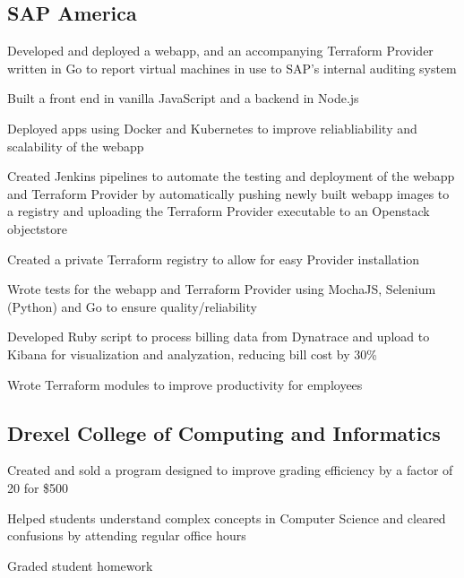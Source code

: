 \documentclass[]{deedy-resume-openfont}
\begin{document}
\begin{minipage}[t]{0.66\textwidth}
    \subsection{SAP America}
    \begin{tightemize}
        \item Developed and deployed a webapp, and an accompanying Terraform Provider written in Go to report virtual machines in use to SAP's internal auditing system
        \item Built a front end in vanilla JavaScript and a backend in Node.js
        \item Deployed apps using Docker and Kubernetes to improve reliabliability and scalability of the webapp
        \item Created Jenkins pipelines to automate the testing and deployment of the webapp and Terraform Provider by automatically pushing newly built webapp images to a registry and uploading the Terraform Provider executable to an Openstack objectstore
        \item Created a private Terraform registry to allow for easy Provider installation
        \item Wrote tests for the webapp and Terraform Provider using MochaJS, Selenium (Python) and Go to ensure quality/reliability
        \item Developed Ruby script to process billing data from Dynatrace and upload to Kibana for visualization and analyzation, reducing bill cost by 30\%
        \item Wrote Terraform modules to improve productivity for employees \\
    \end{tightemize}
    \sectionsep
    
    
    \subsection{Drexel College of Computing and Informatics}
    \begin{tightemize}
        \item Created and sold a program designed to improve grading efficiency by a factor of 20 for \$500
        \item Helped students understand complex concepts in Computer Science and cleared confusions by attending regular office hours
        \item Graded student homework
    \end{tightemize}
    \sectionsep


\end{minipage}
\end{document}
